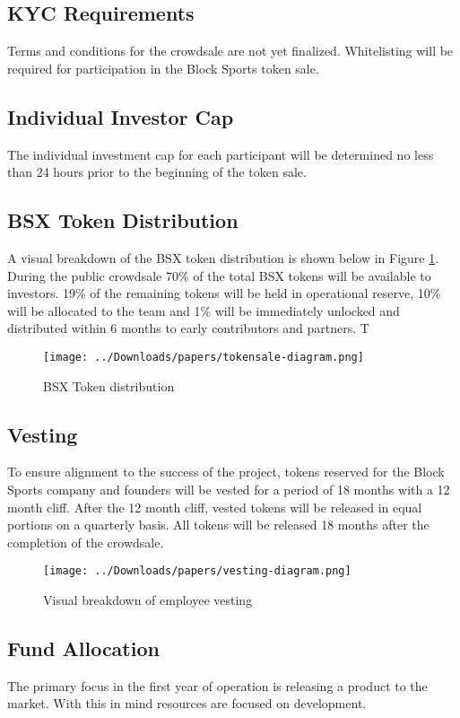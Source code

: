 \documentclass{article}
\begin{document}
	\subsection{KYC Requirements}
Terms and conditions for the crowdsale are not yet finalized. Whitelisting will be required for participation in the Block Sports token sale.

	\subsection{Individual Investor Cap}
The individual investment cap for each participant will be determined no less than 24 hours prior to the beginning of the token sale. 
	
	\subsection{BSX Token Distribution}
A visual breakdown of the BSX token distribution is shown below in Figure \ref{figure:distribution}. During the public crowdsale 70\% of the total BSX tokens will be available to investors. 19\% of the remaining tokens will be held in operational reserve, 10\% will be allocated to the team and 1\% will be immediately unlocked and distributed within 6 months to early contributors and partners. T

\begin{figure}[!htb]
\centering
\texttt{[image: ../Downloads/papers/tokensale-diagram.png]} 
\caption{BSX Token distribution}
\label{figure:distribution}
\end{figure}

	\subsection{Vesting}
To ensure alignment to the success of the project, tokens reserved for the Block Sports company and founders will be vested for a period of 18 months with a 12 month cliff. After the 12 month cliff, vested tokens will be released in equal portions on a quarterly basis. All tokens will be released 18 months after the completion of the crowdsale. 

\begin{figure}[!htb]
\centering
\texttt{[image: ../Downloads/papers/vesting-diagram.png]} 
\caption{Visual breakdown of employee vesting}
\label{figure:vesting}
\end{figure}
	

	\subsection{Fund Allocation}
The primary focus in the first year of operation is releasing a product to the market. With this in mind resources are focused on development.
\end{document}

